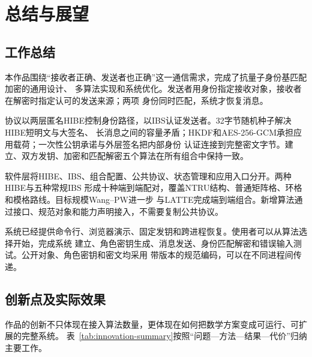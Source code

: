 \chapter{总结与展望}

\section{工作总结}

本作品围绕“接收者正确、发送者也正确”这一通信需求，完成了抗量子身份基匹配加密的通用设计、
多算法实现和系统优化。发送者用身份指定接收对象，接收者在解密时指定认可的发送来源；两项
身份同时匹配，系统才恢复消息。

协议以两层匿名HIBE控制身份路径，以IBS认证发送者。32字节随机种子解决HIBE短明文与大签名、
长消息之间的容量矛盾；HKDF和AES-256-GCM承担应用载荷；一次性公钥承诺与外层签名把内部身份
认证连接到完整密文字节。建立、双方发钥、加密和匹配解密五个算法在所有组合中保持一致。

软件层将HIBE、IBS、组合配置、公共协议、状态管理和应用入口分开。两种HIBE与五种常规IBS
形成十种端到端配对，覆盖NTRU结构、普通矩阵格、环格和模格路线。目标规模Wang--PW进一步
与LATTE完成端到端组合。新增算法通过接口、规范对象和能力声明接入，不需要复制公共协议。

系统已经提供命令行、浏览器演示、固定发钥和跨进程恢复。使用者可以从算法选择开始，完成系统
建立、角色密钥生成、消息发送、身份匹配解密和错误输入测试。公开对象、角色密钥和密文均采用
带版本的规范编码，可以在不同进程间传递。

\section{创新点及实际效果}

作品的创新不只体现在接入算法数量，更体现在如何把数学方案变成可运行、可扩展的完整系统。
表~\ref{tab:innovation-summary}按照“问题—方法—结果—代价”归纳主要工作。

